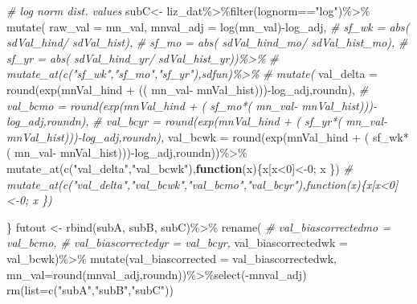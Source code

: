 \documentclass[
]{article}
\newenvironment{Shaded}{\begin{snugshade}}{\end{snugshade}}
\newcommand{\AttributeTok}[1]{\textcolor[rgb]{0.77,0.63,0.00}{#1}}
\newcommand{\CommentTok}[1]{\textcolor[rgb]{0.56,0.35,0.01}{\textit{#1}}}
\newcommand{\ControlFlowTok}[1]{\textcolor[rgb]{0.13,0.29,0.53}{\textbf{#1}}}
\newcommand{\DecValTok}[1]{\textcolor[rgb]{0.00,0.00,0.81}{#1}}
\newcommand{\FunctionTok}[1]{\textcolor[rgb]{0.00,0.00,0.00}{#1}}
\newcommand{\NormalTok}[1]{#1}
\newcommand{\OtherTok}[1]{\textcolor[rgb]{0.56,0.35,0.01}{#1}}
\newcommand{\SpecialCharTok}[1]{\textcolor[rgb]{0.00,0.00,0.00}{#1}}
\newcommand{\StringTok}[1]{\textcolor[rgb]{0.31,0.60,0.02}{#1}}
\begin{document}
\begin{Shaded}
\begin{Highlighting}[]
        \CommentTok{\# log norm dist. values}
\NormalTok{        subC}\OtherTok{\textless{}{-}}\NormalTok{ liz\_dat}\SpecialCharTok{\%\textgreater{}\%}\FunctionTok{filter}\NormalTok{(lognorm}\SpecialCharTok{==}\StringTok{"log"}\NormalTok{)}\SpecialCharTok{\%\textgreater{}\%}
          \FunctionTok{mutate}\NormalTok{(}
          \AttributeTok{raw\_val   =}\NormalTok{ mn\_val,}
          \AttributeTok{mnval\_adj =} \FunctionTok{log}\NormalTok{(mn\_val)}\SpecialCharTok{{-}}\NormalTok{log\_adj,}
          \CommentTok{\# sf\_wk  = abs(  sdVal\_hind/  sdVal\_hist),}
          \CommentTok{\#   sf\_mo  = abs(  sdVal\_hind\_mo/  sdVal\_hist\_mo),}
          \CommentTok{\#   sf\_yr  = abs(  sdVal\_hind\_yr/  sdVal\_hist\_yr))\%\textgreater{}\%}
          \CommentTok{\# mutate\_at(c("sf\_wk","sf\_mo","sf\_yr"),sdfun)\%\textgreater{}\%}
          \CommentTok{\# mutate(}
            \AttributeTok{val\_delta =}   \FunctionTok{round}\NormalTok{(}\FunctionTok{exp}\NormalTok{(mnVal\_hind }\SpecialCharTok{+}\NormalTok{ (( mn\_val}\SpecialCharTok{{-}}\NormalTok{  mnVal\_hist)))}\SpecialCharTok{{-}}\NormalTok{log\_adj,roundn),}
            \CommentTok{\# val\_bcmo  =   round(exp(mnVal\_hind + ( sf\_mo*( mn\_val{-} mnVal\_hist))){-}log\_adj,roundn),}
            \CommentTok{\# val\_bcyr  =   round(exp(mnVal\_hind + ( sf\_yr*( mn\_val{-} mnVal\_hist))){-}log\_adj,roundn),}
             \AttributeTok{val\_bcwk  =}   \FunctionTok{round}\NormalTok{(}\FunctionTok{exp}\NormalTok{(mnVal\_hind }\SpecialCharTok{+}\NormalTok{ ( sf\_wk}\SpecialCharTok{*}\NormalTok{( mn\_val}\SpecialCharTok{{-}}\NormalTok{ mnVal\_hist)))}\SpecialCharTok{{-}}\NormalTok{log\_adj,roundn))}\SpecialCharTok{\%\textgreater{}\%}
          \FunctionTok{mutate\_at}\NormalTok{(}\FunctionTok{c}\NormalTok{(}\StringTok{"val\_delta"}\NormalTok{,}\StringTok{"val\_bcwk"}\NormalTok{),}\ControlFlowTok{function}\NormalTok{(x)\{x[x}\SpecialCharTok{\textless{}}\DecValTok{0}\NormalTok{]}\OtherTok{\textless{}{-}}\DecValTok{0}\NormalTok{;  x  \})}
          \CommentTok{\# mutate\_at(c("val\_delta","val\_bcwk","val\_bcmo","val\_bcyr"),function(x)\{x[x\textless{}0]\textless{}{-}0;  x  \})}
        
\NormalTok{      \}}
\NormalTok{    futout }\OtherTok{\textless{}{-}} \FunctionTok{rbind}\NormalTok{(subA, subB, subC)}\SpecialCharTok{\%\textgreater{}\%}
      \FunctionTok{rename}\NormalTok{(}
        \CommentTok{\# val\_biascorrectedmo = val\_bcmo,}
        \CommentTok{\# val\_biascorrectedyr = val\_bcyr,}
        \AttributeTok{val\_biascorrectedwk =}\NormalTok{ val\_bcwk)}\SpecialCharTok{\%\textgreater{}\%}
      \FunctionTok{mutate}\NormalTok{(}\AttributeTok{val\_biascorrected =}\NormalTok{ val\_biascorrectedwk,}
        \AttributeTok{mn\_val=}\FunctionTok{round}\NormalTok{(mnval\_adj,roundn))}\SpecialCharTok{\%\textgreater{}\%}\FunctionTok{select}\NormalTok{(}\SpecialCharTok{{-}}\NormalTok{mnval\_adj)}
    \FunctionTok{rm}\NormalTok{(}\AttributeTok{list=}\FunctionTok{c}\NormalTok{(}\StringTok{"subA"}\NormalTok{,}\StringTok{"subB"}\NormalTok{,}\StringTok{"subC"}\NormalTok{))}
\end{Highlighting}
\end{Shaded}
\end{document}
